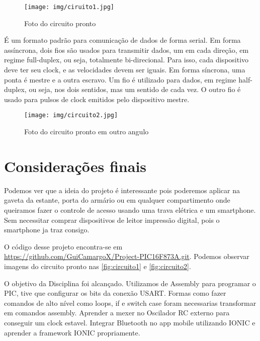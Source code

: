 \documentclass[
	article,			%
	12pt,				%
	oneside,			%
	a4paper,            %
	twocolumn,
	english,			%
	brazil,				%
	sumario=tradicional
	]{abntex2}
\begin{document}
\begin{figure}[!h]
    \centering
    \texttt{[image: img/ciruito1.jpg]}
    \caption{Foto do circuito pronto}
    \label{fig:circuito1}
\end{figure}

É um formato padrão para comunicação de dados de forma serial. Em forma assíncrona, dois fios são usados para transmitir dados, um em cada direção, em regime full-duplex, ou seja, totalmente bi-direcional. Para isso, cada dispositivo deve ter seu clock, e as velocidades devem ser iguais. Em forma síncrona, uma ponta é mestre e a outra escravo. Um fio é utilizado para dados, em regime half-duplex, ou seja, nos dois sentidos, mas um sentido de cada vez. O outro fio é usado para pulsos de clock emitidos pelo dispositivo mestre.


\begin{figure}[!h]
    \centering
    \texttt{[image: img/circuito2.jpg]}
    \caption{Foto do circuito pronto em outro angulo}
    \label{fig:circuito2}
\end{figure}

% 

\section*{Considerações finais}

Podemos ver que a ideia do projeto é interessante pois poderemos aplicar na gaveta da estante, porta do armário ou em qualquer compartimento onde queiramos fazer o controle de acesso usando uma trava elétrica e um smartphone. Sem necessitar comprar dispositivos de leitor impressão digital, pois o smartphone ja traz consigo.

O código desse projeto encontra-se em \url{https://github.com/GuiCamargoX/Project-PIC16F873A.git}. Podemos observar imagens do circuito pronto nas \autoref{fig:circuito1} e \autoref{fig:circuito2}.

O objetivo da Disciplina foi alcançado. Utilizamos de Assembly para programar o PIC, tive que configurar os bits da conexão USART. Formas como fazer comandos de alto nível como loops, if e switch case foram necessarias transformar em comandos assembly.
Aprender a mexer no Oscilador RC externo para conseguir um clock estavel. Integrar Bluetooth no app mobile utilizando IONIC e
aprender a framework IONIC propriamente.
\end{document}
